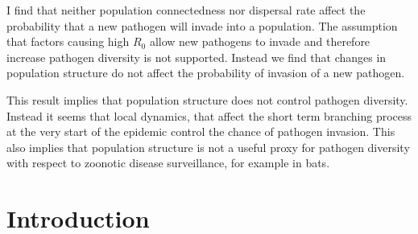 I find that neither population connectedness nor dispersal rate affect the probability that a new pathogen will invade into a population.
The assumption that factors causing high $R_0$ allow new pathogens to invade and therefore increase pathogen diversity is not supported.
Instead we find that changes in population structure do not affect the probability of invasion of a new pathogen.
 

This result implies that population structure does not control pathogen diversity.
Instead it seems that local dynamics, that affect the short term branching process at the very start of the epidemic control the chance of pathogen invasion.
This also implies that population structure is not a useful proxy for pathogen diversity with respect to zoonotic disease surveillance, for example in bats.









\section{Introduction}







